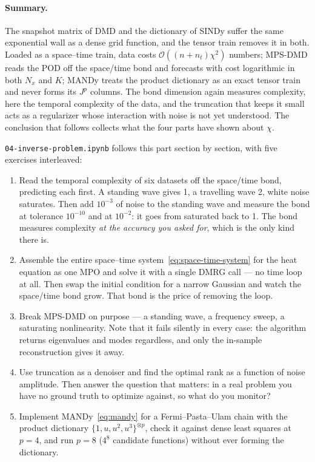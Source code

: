 \paragraph{Summary.}
The snapshot matrix of DMD and the dictionary of SINDy suffer the same
exponential wall as a dense grid function, and the tensor train removes it in
both. Loaded as a space--time train, data costs $\mathcal O((n+n_t)\chi^2)$
numbers; MPS-DMD reads the POD off the space/time bond and forecasts with cost
logarithmic in both $N_x$ and $K$; MANDy treats the product dictionary as an
exact tensor train and never forms its $J^p$ columns. The bond dimension again
measures complexity, here the temporal complexity of the data, and the
truncation that keeps it small acts as a regularizer whose interaction with
noise is not yet understood. The conclusion that follows collects what the four
parts have shown about $\chi$.

\begin{exercise}
  \texttt{04-inverse-problem.ipynb} follows this part section by section, with
  five exercises interleaved:

  \begin{enumerate}
    \item Read the temporal complexity of six datasets off the space/time bond,
      predicting each first. A standing wave gives 1, a travelling wave 2, white
      noise saturates. Then add $10^{-3}$ of noise to the standing wave and
      measure the bond at tolerance $10^{-10}$ and at $10^{-2}$: it goes from
      saturated back to 1. The bond measures complexity \emph{at the accuracy you
      asked for}, which is the only kind there is.
    \item Assemble the entire space--time system~\eqref{eq:space-time-system}
      for the heat equation as one MPO and solve it with a single DMRG call ---
      no time loop at all. Then swap the initial condition for a narrow Gaussian
      and watch the space/time bond grow. That bond is the price of removing the
      loop.
    \item Break MPS-DMD on purpose --- a standing wave, a frequency sweep, a
      saturating nonlinearity. Note that it fails silently in every case: the
      algorithm returns eigenvalues and modes regardless, and only the in-sample
      reconstruction gives it away.
    \item Use truncation as a denoiser and find the optimal rank as a function of
      noise amplitude. Then answer the question that matters: in a real problem
      you have no ground truth to optimize against, so what do you monitor?
    \item Implement MANDy~\eqref{eq:mandy} for a Fermi--Pasta--Ulam chain with
      the product dictionary $\{1, u, u^2, u^3\}^{\otimes p}$, check it against
      dense least squares at $p = 4$, and run $p = 8$ ($4^8$ candidate
      functions) without ever forming the dictionary.
  \end{enumerate}
\end{exercise}

